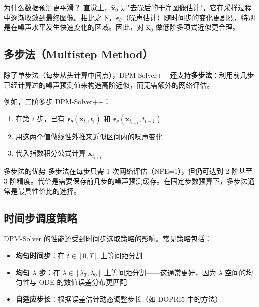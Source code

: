 \documentclass[a4paper]{article}
\begin{document}
\begin{knowledgebox}{为什么数据预测更平滑？}
直觉上，$\hat{\mathbf{x}}_0$ 是"去噪后的干净图像估计"，它在采样过程中逐渐收敛到最终图像。相比之下，$\boldsymbol{\epsilon}_\theta$（噪声估计）随时间步的变化更剧烈，特别是在噪声水平发生快速变化的区域。因此，对 $\hat{\mathbf{x}}_0$ 做低阶多项式近似更合理。
\end{knowledgebox}

\subsection{多步法（Multistep Method）}

除了单步法（每步从头计算中间点），DPM-Solver++ 还支持\textbf{多步法}：利用前几步已经计算过的噪声预测值来构造高阶近似，而无需额外的网络评估。

例如，二阶多步 DPM-Solver++：
\begin{enumerate}
    \item 在第 $i$ 步，已有 $\boldsymbol{\epsilon}_\theta(\mathbf{x}_{t_i}, t_i)$ 和 $\boldsymbol{\epsilon}_\theta(\mathbf{x}_{t_{i-1}}, t_{i-1})$
    \item 用这两个值做线性外推来近似区间内的噪声变化
    \item 代入指数积分公式计算 $\mathbf{x}_{t_{i+1}}$
\end{enumerate}

\begin{importantbox}{多步法的优势}
多步法在每步只需 1 次网络评估（NFE=1），但仍可达到 2 阶甚至 3 阶精度。代价是需要保存前几步的噪声预测缓存。在固定步数预算下，多步法通常是最具性价比的选择。
\end{importantbox}

\subsection{时间步调度策略}

DPM-Solver 的性能还受到时间步选取策略的影响。常见策略包括：

\begin{itemize}
    \item \textbf{均匀时间步}：在 $t \in [0, T]$ 上等间距分割
    \item \textbf{均匀 $\lambda$ 步}：在 $\lambda \in [\lambda_T, \lambda_0]$ 上等间距分割——这通常更好，因为 $\lambda$ 空间的均匀性与 ODE 的数值误差分布更匹配
    \item \textbf{自适应步长}：根据误差估计动态调整步长（如 DOPRI5 中的方法）
\end{itemize}
\end{document}
